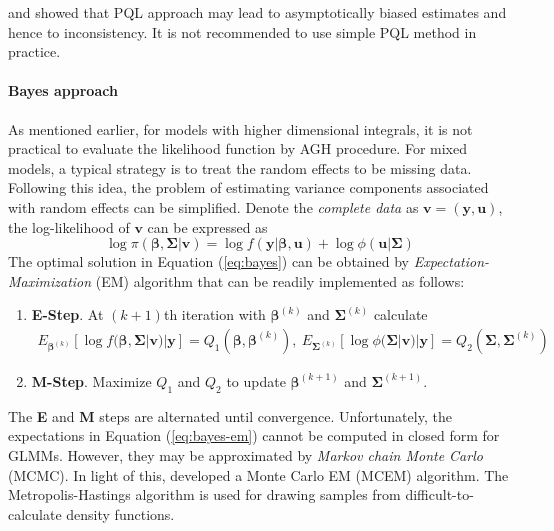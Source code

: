 \cite{breslow1995bias}  and \cite{pinheiro2006efficient} showed that PQL approach may lead to
asymptotically biased estimates and hence to inconsistency. It is not recommended to use simple PQL
method in practice. 


\paragraph{Bayes approach}
As mentioned earlier, for models with higher dimensional integrals, it is not practical to
evaluate the likelihood function by AGH procedure. For mixed models, a typical strategy is to treat
the random effects to be missing data. Following this idea, the problem of estimating variance
components associated with random effects can be simplified. Denote the \textit{complete data} as
$\bm v = (\bm y, \bm u)$, the log-likelihood of $\bm v$ can be expressed as 
\begin{equation}\label{eq:bayes}
\log \pi(\bm \beta , \bm \Sigma|\bm v) = \log f(\bm y|\bm \beta, \bm u) + \log \phi(\bm u|\bm
\Sigma)
\end{equation}  
The optimal solution in Equation (\ref{eq:bayes}) can be obtained by
\textit{Expectation-Maximization} (EM) algorithm that can be readily implemented as follows:
\begin{enumerate}
	\item \textbf{E-Step}. At $(k+1)$th iteration with $\bm \beta^{(k)}$ and $\bm\Sigma^{(k)}$  
	calculate 
	\begin{equation}\label{eq:bayes-em}
	\begin{aligned}
	E_{\bm \beta^{(k)}}[\log f(\bm \beta , \bm \Sigma|\bm v)|\bm y]= Q_1(\bm \beta, \bm \beta^{(k)}),
	~
	E_{\bm \Sigma^{(k)}}[\log \phi(\bm \Sigma|\bm v)|\bm y]= Q_2(\bm \Sigma, \bm \Sigma^{(k)})
	\end{aligned}
	\end{equation}
	\item \textbf{M-Step}. Maximize $Q_1$ and $Q_2$ to update  $\bm \beta^{(k+1)}$ and
	$\bm\Sigma^{(k+1)}$.
\end{enumerate}
The \textbf{E} and \textbf{M} steps are alternated until convergence. Unfortunately, the
expectations in Equation (\ref{eq:bayes-em}) cannot be computed in closed form for GLMMs. However,
they may be approximated by \textit{Markov chain Monte Carlo} (MCMC). In light of this,
\cite{mcculloch1997maximum} developed a Monte Carlo EM (MCEM) algorithm. The Metropolis-Hastings
algorithm is used for drawing samples from difficult-to-calculate density functions.

